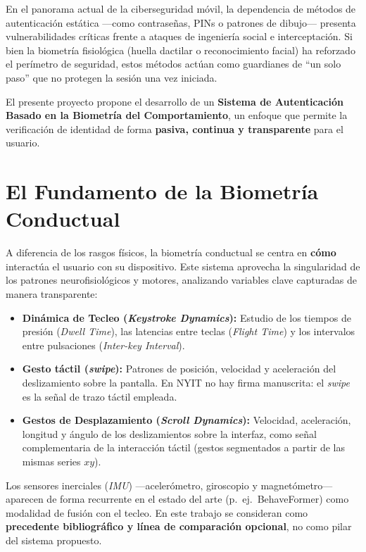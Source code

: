 
En el panorama actual de la ciberseguridad móvil, la dependencia de métodos de autenticación estática ---como contraseñas, PINs o patrones de dibujo--- presenta vulnerabilidades críticas frente a ataques de ingeniería social e interceptación. Si bien la biometría fisiológica (huella dactilar o reconocimiento facial) ha reforzado el perímetro de seguridad, estos métodos actúan como guardianes de ``un solo paso'' que no protegen la sesión una vez iniciada.

El presente proyecto propone el desarrollo de un \textbf{Sistema de Autenticación Basado en la Biometría del Comportamiento}, un enfoque que permite la verificación de identidad de forma \textbf{pasiva, continua y transparente} para el usuario.

\section{El Fundamento de la Biometría Conductual}

A diferencia de los rasgos físicos, la biometría conductual se centra en \textbf{cómo} interactúa el usuario con su dispositivo. Este sistema aprovecha la singularidad de los patrones neurofisiológicos y motores, analizando variables clave capturadas de manera transparente:

\begin{itemize}
    \item \textbf{Dinámica de Tecleo (\textit{Keystroke Dynamics}):} Estudio de los tiempos de presión (\textit{Dwell Time}), las latencias entre teclas (\textit{Flight Time}) y los intervalos entre pulsaciones (\textit{Inter-key Interval}).
    \item \textbf{Gesto táctil (\textit{swipe}):} Patrones de posición, velocidad y aceleración del deslizamiento sobre la pantalla. En NYIT no hay firma manuscrita: el \textit{swipe} es la señal de trazo táctil empleada.
    \item \textbf{Gestos de Desplazamiento (\textit{Scroll Dynamics}):} Velocidad, aceleración, longitud y ángulo de los deslizamientos sobre la interfaz, como señal complementaria de la interacción táctil (gestos segmentados a partir de las mismas series $xy$).
\end{itemize}

Los sensores inerciales (\textit{IMU}) ---acelerómetro, giroscopio y magnetómetro--- aparecen de forma recurrente en el estado del arte (p.~ej.\ BehaveFormer) como modalidad de fusión con el tecleo. En este trabajo se consideran como \textbf{precedente bibliográfico y línea de comparación opcional}, no como pilar del sistema propuesto.

